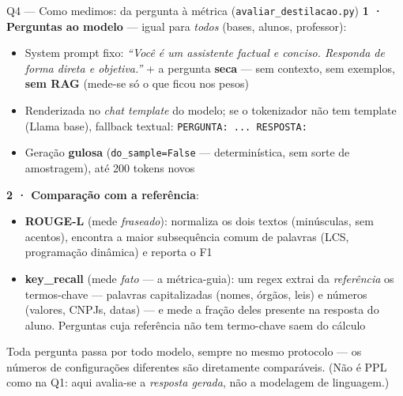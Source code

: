 \documentclass[10pt,aspectratio=169]{beamer}
\begin{document}
\begin{frame}[fragile]{Q4 — Como medimos: da pergunta à métrica (\texttt{avaliar\_destilacao.py})}
  \textbf{1 · Perguntas ao modelo} — igual para \emph{todos} (bases, alunos, professor):
  \begin{itemize}\small
    \item System prompt fixo: \emph{``Você é um assistente factual e conciso. Responda de forma
      direta e objetiva.''} + a pergunta \textbf{seca} — sem contexto, sem exemplos,
      \textbf{sem RAG} (mede-se só o que ficou nos pesos)
    \item Renderizada no \emph{chat template} do modelo; se o tokenizador não tem template
      (Llama base), fallback textual: \texttt{PERGUNTA: ...\ RESPOSTA:}
    \item Geração \textbf{gulosa} (\texttt{do\_sample=False} — determinística, sem sorte de amostragem),
      até 200 tokens novos
  \end{itemize}
  \vspace{4pt}
  \textbf{2 · Comparação com a referência}:
  \begin{itemize}\small
    \item \textbf{ROUGE-L} (mede \emph{fraseado}): normaliza os dois textos (minúsculas, sem acentos),
      encontra a maior subsequência comum de palavras (LCS, programação dinâmica) e reporta o F1
    \item \textbf{key\_recall} (mede \emph{fato} — a métrica-guia): um regex extrai da
      \emph{referência} os termos-chave — palavras capitalizadas (nomes, órgãos, leis) e números
      (valores, CNPJs, datas) — e mede a fração deles presente na resposta do aluno.
      Perguntas cuja referência não tem termo-chave saem do cálculo
  \end{itemize}
  \vspace{4pt}
  \small Toda pergunta passa por todo modelo, sempre no mesmo protocolo — os números de
  configurações diferentes são diretamente comparáveis. (Não é PPL como na Q1: aqui avalia-se a
  \emph{resposta gerada}, não a modelagem de linguagem.)
\end{frame}
\end{document}
